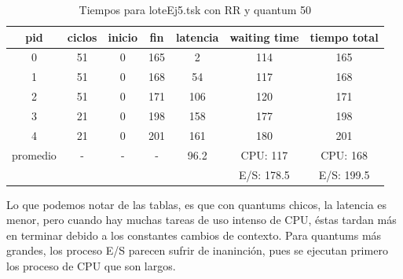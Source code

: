 \begin{table}
\centering
\begin{tabular}{ | c | c | c | c | c | c | c | }
  \hline			
  pid & ciclos & inicio & fin & latencia & waiting time & tiempo total  \\
  \hline
0 & 51 & 0 & 165 & 2 & 114 & 165\\
1 & 51 & 0 & 168 & 54 & 117 & 168\\
2 & 51 & 0 & 171 & 106 & 120 & 171\\
3 & 21 & 0 & 198 & 158 & 177 & 198\\
4 & 21 & 0 & 201 & 161 & 180 & 201\\
  \hline
promedio & - & - & - & 96.2 & CPU: 117  & CPU: 168 \\
                & &  &  &  & E/S: 178.5  & E/S: 199.5\\
  \hline
\end{tabular}
\caption{Tiempos para loteEj5.tsk con RR y quantum 50}\label{tab:ej5q50}
\end{table}
Lo que podemos notar de las tablas, es que con quantums chicos, la latencia es menor, pero cuando hay muchas tareas de uso intenso de CPU, éstas tardan más en terminar debido a los constantes cambios de contexto. Para quantums más grandes, los proceso E/S parecen sufrir de inaninción, pues se ejecutan primero los proceso de CPU que son largos.\par